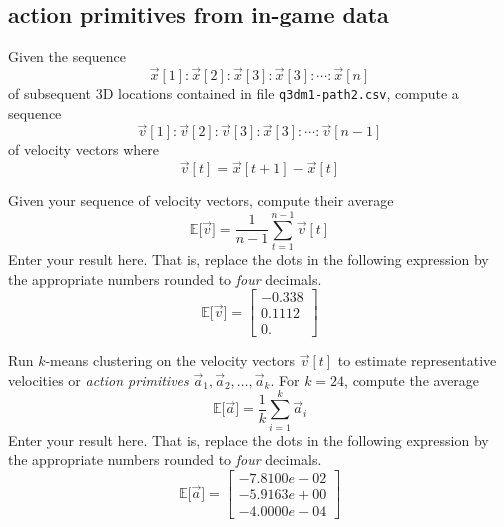 
\color{black}
\subsection*{action primitives from in-game data}

Given the sequence
\begin{equation*}
\vec{x}[1]:\vec{x}[2]:\vec{x}[3]:\vec{x}[3]:\cdots:\vec{x}[n]
\end{equation*}
of subsequent 3D locations contained in file \texttt{q3dm1-path2.csv}, compute a sequence
\begin{equation*}
\vec{v}[1]:\vec{v}[2]:\vec{v}[3]:\vec{x}[3]:\cdots:\vec{v}[n-1]
\end{equation*}
of velocity vectors where 
\begin{equation*}
\vec{v}[t] = \vec{x}[t+1] - \vec{x}[t]
\end{equation*}





\vspace{2cm}
Given your sequence of velocity vectors, compute their average
\begin{equation*}
\mathbb{E} \bigl[ \vec{v} \bigr] = \frac{1}{n-1} \sum_{t=1}^{n-1} \vec{v}[t]
\end{equation*}
Enter your result here. That is, replace the dots in the following expression by the appropriate numbers rounded to \emph{four} decimals. \color{blue}
\begin{equation*}
\mathbb{E} \bigl[ \vec{v} \bigr] = \begin{bmatrix} -0.338 \\  0.1112 \\ 0.     \end{bmatrix}
\end{equation*}
\color{black}





\vspace{2cm}
Run $k$-means clustering on the velocity vectors $\vec{v}[t]$ to estimate representative velocities or \emph{action primitives} $\vec{a}_1, \vec{a}_2, \ldots, \vec{a}_k$. For $k=24$, compute the average
\begin{equation*}
\mathbb{E} \bigl[ \vec{a} \bigr] = \frac{1}{k} \sum_{i=1}^{k} \vec{a}_i
\end{equation*}
Enter your result here. That is, replace the dots in the following expression by the appropriate numbers rounded to \emph{four} decimals. \color{blue}
\begin{equation*}
\mathbb{E} \bigl[ \vec{a} \bigr] = \begin{bmatrix} -7.8100e-02 \\ -5.9163e+00 \\ -4.0000e-04 \end{bmatrix}
\end{equation*}
\color{black}